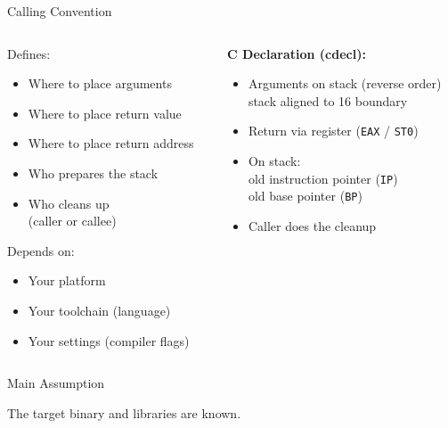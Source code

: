 \documentclass[beamer]{uibk}
\begin{document}
\begin{frame}{Calling Convention}
    \begin{columns}
        \begin{column}{0.5\textwidth}
            Defines:
            \begin{itemize}
                \item Where to place arguments
                \item Where to place return value
                \item Where to place return address
                \item Who prepares the stack
                \item Who cleans up\\
                    (caller or callee)
            \end{itemize}
            \pause
            Depends on:
            \begin{itemize}
                \item Your platform
                \item Your toolchain (language)
                \item Your settings (compiler flags)
            \end{itemize}
        \end{column}
        \pause
        \begin{column}{0.5\textwidth}
            \textbf{C Declaration (cdecl):}
            \begin{itemize}
                \item Arguments on stack (reverse order)\\
                    stack aligned to \SI{16}{\byte} boundary
                \item Return via register (\texttt{EAX} / \texttt{ST0})
                \item On stack:\\
                    old instruction pointer (\texttt{IP})\\
                    old base pointer (\texttt{BP})
                \item Caller does the cleanup
            \end{itemize}
        \end{column}
    \end{columns}
\end{frame}

\begin{frame}{Main Assumption}
   \begin{center}
       \huge The target binary and libraries are known.
   \end{center}
\end{frame}
\end{document}
